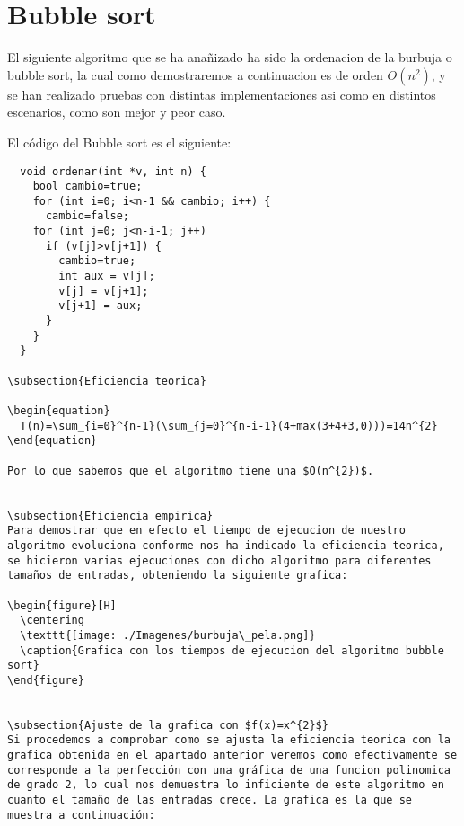 \section{Bubble sort}
El siguiente algoritmo que se ha anañizado ha sido la ordenacion de la burbuja o bubble sort, la cual como demostraremos a continuacion es de orden $O(n^{2})$, y se han realizado pruebas con distintas implementaciones asi como en distintos escenarios, como son mejor y peor caso.

El código del Bubble sort es el siguiente:

\begin{lstlisting}
  void ordenar(int *v, int n) {
    bool cambio=true;
    for (int i=0; i<n-1 && cambio; i++) {
      cambio=false;
    for (int j=0; j<n-i-1; j++)
      if (v[j]>v[j+1]) {
        cambio=true;
        int aux = v[j];
        v[j] = v[j+1];
        v[j+1] = aux;
      }
    }
  }

\subsection{Eficiencia teorica}

\begin{equation}
  T(n)=\sum_{i=0}^{n-1}(\sum_{j=0}^{n-i-1}(4+max(3+4+3,0)))=14n^{2}
\end{equation}

Por lo que sabemos que el algoritmo tiene una $O(n^{2})$.


\subsection{Eficiencia empirica}
Para demostrar que en efecto el tiempo de ejecucion de nuestro algoritmo evoluciona conforme nos ha indicado la eficiencia teorica, se hicieron varias ejecuciones con dicho algoritmo para diferentes tamaños de entradas, obteniendo la siguiente grafica:

\begin{figure}[H]
  \centering
  \texttt{[image: ./Imagenes/burbuja\_pela.png]}
  \caption{Grafica con los tiempos de ejecucion del algoritmo bubble sort}
\end{figure}


\subsection{Ajuste de la grafica con $f(x)=x^{2}$}
Si procedemos a comprobar como se ajusta la eficiencia teorica con la grafica obtenida en el apartado anterior veremos como efectivamente se corresponde a la perfección con una gráfica de una funcion polinomica de grado 2, lo cual nos demuestra lo inficiente de este algoritmo en cuanto el tamaño de las entradas crece. La grafica es la que se muestra a continuación:


\end{lstlisting}
